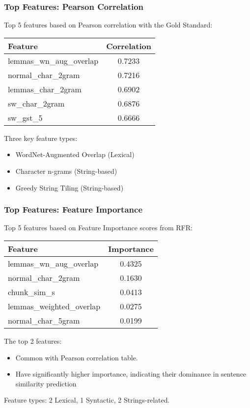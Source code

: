 \begin{frame}
    \frametitle{Top Features: Pearson Correlation}
    Top 5 features based on Pearson correlation with the Gold Standard:
  
    \begin{table}[ht]
      \centering
      \begin{tabular}{|l|c|}
        \hline
        \textbf{Feature} & \textbf{Correlation} \\
        \hline
        lemmas\_wn\_aug\_overlap & 0.7233 \\
        normal\_char\_2gram & 0.7216 \\
        lemmas\_char\_2gram & 0.6902 \\
        sw\_char\_2gram & 0.6876 \\
        sw\_gst\_5 & 0.6666 \\
        \hline
      \end{tabular}
    \end{table}
  
    Three key feature types:
    \begin{itemize}
      \item WordNet-Augmented Overlap (Lexical)
      \item Character n-grams (String-based)
      \item Greedy String Tiling (String-based)
    \end{itemize}
\end{frame}

\begin{frame}
    \frametitle{Top Features: Feature Importance}
    Top 5 features based on Feature Importance scores from RFR:
  
    \begin{table}[ht]
      \centering
      \begin{tabular}{|l|c|}
        \hline
        \textbf{Feature} & \textbf{Importance} \\
        \hline
        lemmas\_wn\_aug\_overlap & 0.4325 \\
        normal\_char\_2gram & 0.1630 \\
        chunk\_sim\_s & 0.0413 \\
        lemmas\_weighted\_overlap & 0.0275 \\
        normal\_char\_5gram & 0.0199 \\
        \hline
      \end{tabular}
    \end{table}
  
    The top 2 features:
    \begin{itemize}
      \item Common with Pearson correlation table.
      \item Have significantly higher importance, indicating their dominance in sentence similarity prediction
    \end{itemize}
    
    Feature types: 2 Lexical, 1 Syntactic, 2 Strings-related.
\end{frame}